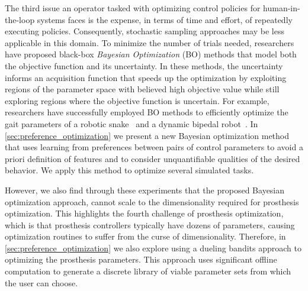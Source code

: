 The third issue an operator tasked with optimizing control policies for
human-in-the-loop systems faces is the expense, in terms of time and effort, of
repeatedly executing policies. Consequently, stochastic sampling approaches may
be less applicable in this domain. To minimize the number of trials needed,
researchers have proposed black-box \emph{Bayesian Optimization} (BO) methods
that model both the objective function and its uncertainty. In these methods,
the uncertainty informs an acquisition function that speeds up the optimization
by exploiting regions of the parameter space with believed high objective value
while still exploring regions where the objective function is uncertain. For
example, researchers have successfully employed BO methods to efficiently
optimize the gait parameters of a robotic snake~\citep{tesch2011using} and a
dynamic bipedal robot~\citep{calandra2014bayesian}. In
\cref{sec:preference_optimization} we present a new Bayesian optimization method
that uses learning from preferences between pairs of control parameters to avoid
a priori definition of features and to consider unquantifiable qualities of the
desired behavior. We apply this method to optimize several simulated tasks.

However, we also find through these experiments that the proposed Bayesian
optimization approach, cannot scale to the dimensionality required for
prosthesis optimization. This highlights the fourth challenge of prosthesis
optimization, which is that prosthesis controllers typically have dozens of
parameters, causing optimization routines to suffer from the curse of
dimensionality. Therefore, in \cref{sec:preference_optimization} we also explore
using a dueling bandits \citep{yue2012k} approach to optimizing the prosthesis
parameters. This approach uses significant offline computation to generate a
discrete library of viable parameter sets from which the user can choose.

